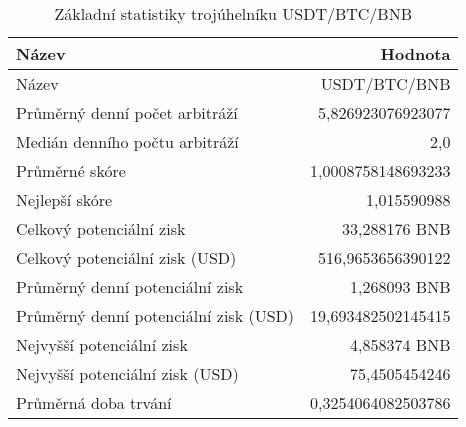 \begin{table}\centering
\caption{Základní statistiky trojúhelníku USDT/BTC/BNB}
\label{USDTBTCBNB_stats}
\begin{tabular}{|| l | r ||}
\hline Název & Hodnota \\ 
\hline\hline Název & USDT/BTC/BNB \\ 
\hline Průměrný denní počet arbitráží & 5,826923076923077 \\ 
\hline Medián denního počtu arbitráží & 2,0 \\ 
\hline Průměrné skóre & 1,0008758148693233 \\ 
\hline Nejlepší skóre & 1,015590988 \\ 
\hline Celkový potenciální zisk & 33,288176 BNB \\ 
\hline Celkový potenciální zisk (USD) & 516,9653656390122 \\ 
\hline Průměrný denní potenciální zisk & 1,268093 BNB \\ 
\hline Průměrný denní potenciální zisk (USD) & 19,693482502145415 \\ 
\hline Nejvyšší potenciální zisk & 4,858374 BNB \\ 
\hline Nejvyšší potenciální zisk (USD) & 75,4505454246 \\ 
\hline Průměrná doba trvání & 0,3254064082503786 \\ 
\hline
\end{tabular}
\end{table}
